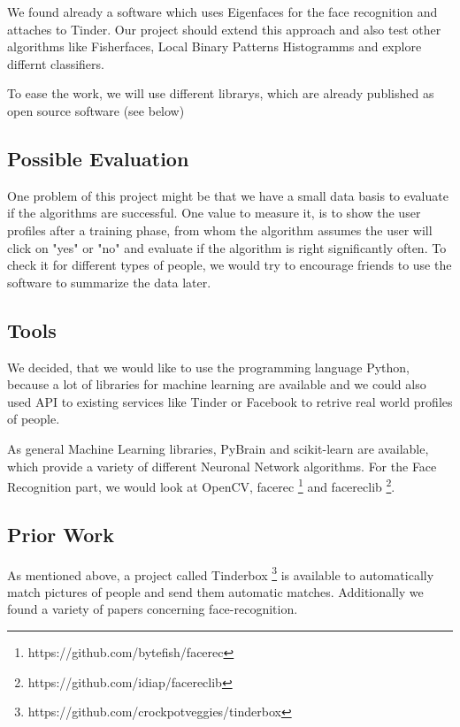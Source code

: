 \documentclass{article}
\begin{document}
We found already a software which uses Eigenfaces for the face recognition and attaches to Tinder.
Our project should extend this approach and also test other algorithms like Fisherfaces, Local Binary Patterns Histogramms and explore differnt classifiers.

To ease the work, we will use different librarys, which are already published as open source software (see below)

\subsection{Possible Evaluation}

One problem of this project might be that we have a small data basis to evaluate if the algorithms are successful.
One value to measure it, is to show the user profiles after a training phase, from whom the algorithm assumes the user will click on "yes" or "no" and evaluate if the algorithm is right significantly often.
To check it for different types of people, we would try to encourage friends to use the software to summarize the data later.

\subsection{Tools}

We decided, that we would like to use the programming language Python, because a lot of libraries for machine learning are available and we could also used API to existing services like Tinder or Facebook to retrive real world profiles of people.

As general Machine Learning libraries, PyBrain and scikit-learn are available, which provide a variety of different Neuronal Network algorithms.
For the Face Recognition part, we would look at OpenCV, facerec \footnote{https://github.com/bytefish/facerec} and facereclib \footnote{https://github.com/idiap/facereclib}.

\subsection{Prior Work}

As mentioned above, a project called Tinderbox \footnote{https://github.com/crockpotveggies/tinderbox} is available to automatically match pictures of people and send them automatic matches.
Additionally we found a variety of papers concerning face-recognition.



%
%
\end{document}

